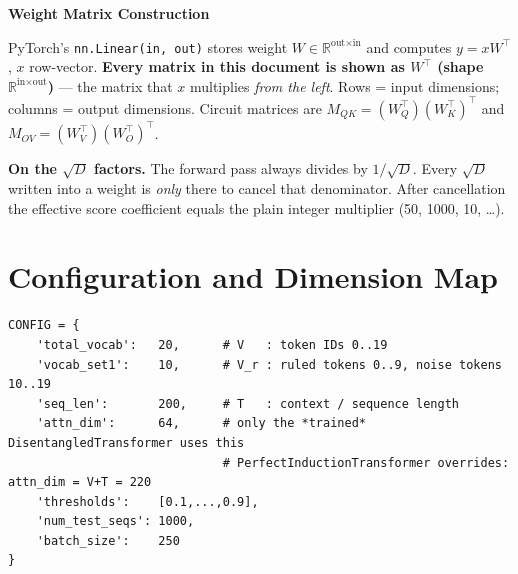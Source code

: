 \documentclass[11pt]{article}
\newcommand{\R}{\mathbb{R}}
\begin{document}
\begin{center}{\LARGE\bfseries Weight Matrix Construction}\end{center}
\vspace{1em}

\begin{conventionbox}
PyTorch's \texttt{nn.Linear(in, out)} stores weight $W \in \R^{\text{out}\times\text{in}}$ and computes
$y = xW^\top$, $x$ row-vector. \textbf{Every matrix in this document is shown as $W^\top$ (shape
$\R^{\text{in}\times\text{out}}$)} --- the matrix that $x$ multiplies \emph{from the left}.
Rows = input dimensions; columns = output dimensions.
Circuit matrices are $M_{QK}=(W_Q^\top)(W_K^\top)^\top$ and $M_{OV}=(W_V^\top)(W_O^\top)^\top$.

\medskip
\textbf{On the $\sqrt{D}$ factors.} The forward pass always divides by $1/\sqrt{D}$. Every $\sqrt{D}$
written into a weight is \emph{only} there to cancel that denominator. After cancellation the effective
score coefficient equals the plain integer multiplier (50, 1000, 10, \ldots).
\end{conventionbox}

\tableofcontents
\newpage

\section{Configuration and Dimension Map}

\begin{lstlisting}
CONFIG = {
    'total_vocab':   20,      # V   : token IDs 0..19
    'vocab_set1':    10,      # V_r : ruled tokens 0..9, noise tokens 10..19
    'seq_len':       200,     # T   : context / sequence length
    'attn_dim':      64,      # only the *trained* DisentangledTransformer uses this
                              # PerfectInductionTransformer overrides: attn_dim = V+T = 220
    'thresholds':    [0.1,...,0.9],
    'num_test_seqs': 1000,
    'batch_size':    250
}
\end{lstlisting}
\end{document}
